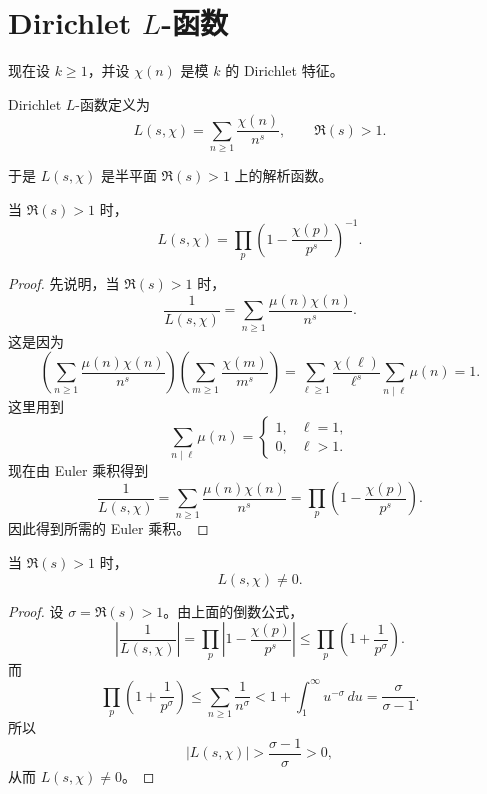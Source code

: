 \section{\texorpdfstring{Dirichlet \(L\)-函数}{Dirichlet L-函数}}

现在设 $k\geq 1$，并设 $\chi(n)$ 是模 $k$ 的 Dirichlet 特征。

\begin{definition}[Dirichlet \(L\)-函数]
	Dirichlet \(L\)-函数定义为
	\[
		L(s,\chi)=\sum_{n\geq 1}\frac{\chi(n)}{n^s},
		\qquad \Re(s)>1.
	\]
\end{definition}

于是 $L(s,\chi)$ 是半平面 $\Re(s)>1$ 上的解析函数。

\begin{lemma}[Euler 乘积]
	当 $\Re(s)>1$ 时，
	\begin{equation}
		L(s,\chi)=\prod_p\left(1-\frac{\chi(p)}{p^s}\right)^{-1}.
		\tag{1}
	\end{equation}
\end{lemma}

\begin{proof}
	先说明，当 $\Re(s)>1$ 时，
	\[
		\frac{1}{L(s,\chi)}
		=
		\sum_{n\geq 1}\frac{\mu(n)\chi(n)}{n^s}.
	\]
	这是因为
	\[
		\left(\sum_{n\geq 1}\frac{\mu(n)\chi(n)}{n^s}\right)
		\left(\sum_{m\geq 1}\frac{\chi(m)}{m^s}\right)
		=
		\sum_{\ell\geq 1}\frac{\chi(\ell)}{\ell^s}
		\sum_{n\mid \ell}\mu(n)
		=1.
	\]
	这里用到
	\[
		\sum_{n\mid \ell}\mu(n)=
		\begin{cases}
			1, & \ell=1,\\
			0, & \ell>1.
		\end{cases}
	\]
	现在由 Euler 乘积得到
	\[
		\frac{1}{L(s,\chi)}
		=
		\sum_{n\geq 1}\frac{\mu(n)\chi(n)}{n^s}
		=
		\prod_p\left(1-\frac{\chi(p)}{p^s}\right).
	\]
	因此得到所需的 Euler 乘积。
\end{proof}

\begin{corollary}
	当 $\Re(s)>1$ 时，
	\[
		L(s,\chi)\neq 0.
	\]
\end{corollary}

\begin{proof}
	设 $\sigma=\Re(s)>1$。由上面的倒数公式，
	\[
		\left|\frac{1}{L(s,\chi)}\right|
		=
		\prod_p\left|1-\frac{\chi(p)}{p^s}\right|
		\leq
		\prod_p\left(1+\frac{1}{p^\sigma}\right).
	\]
	而
	\[
		\prod_p\left(1+\frac{1}{p^\sigma}\right)
		\leq
		\sum_{n\geq 1}\frac{1}{n^\sigma}
		<
		1+\int_1^\infty u^{-\sigma}\,du
		=
		\frac{\sigma}{\sigma-1}.
	\]
	所以
	\[
		|L(s,\chi)|>\frac{\sigma-1}{\sigma}>0,
	\]
	从而 $L(s,\chi)\neq 0$。
\end{proof}

